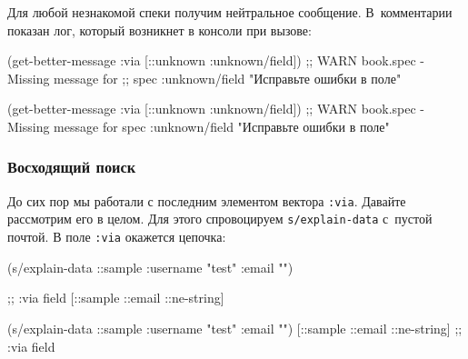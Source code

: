 \fi

\noindent
Для любой незнакомой спеки получим нейтральное сообщение. В~комментарии показан
лог, который возникнет в консоли при вызове:

\ifx\devicetype\mobile

  \begin{clojure}
(get-better-message
    {:via [::unknown :unknown/field]})
;; WARN book.spec - Missing message for
;; spec :unknown/field
"Исправьте ошибки в поле"
  \end{clojure}

\else

  \begin{clojure}
(get-better-message {:via [::unknown :unknown/field]})
;; WARN book.spec - Missing message for spec :unknown/field
"Исправьте ошибки в поле"
  \end{clojure}

\fi

\subsubsection{Восходящий поиск}

До сих пор мы работали с последним элементом вектора \verb|:via|. Давайте
рассмотрим его в целом. Для этого спровоцируем \verb|s/explain-data| с~пустой
почтой. В поле \verb|:via| окажется цепочка:

\ifx\devicetype\mobile

\begin{english}
  \begin{clojure}
(s/explain-data ::sample
  {:username "test" :email ""})

;; :via field
[::sample ::email ::ne-string]
  \end{clojure}
\end{english}

\else

\begin{english}
  \begin{clojure}
(s/explain-data ::sample {:username "test" :email ""})
[::sample ::email ::ne-string] ;; :via field
  \end{clojure}
\end{english}

\fi


